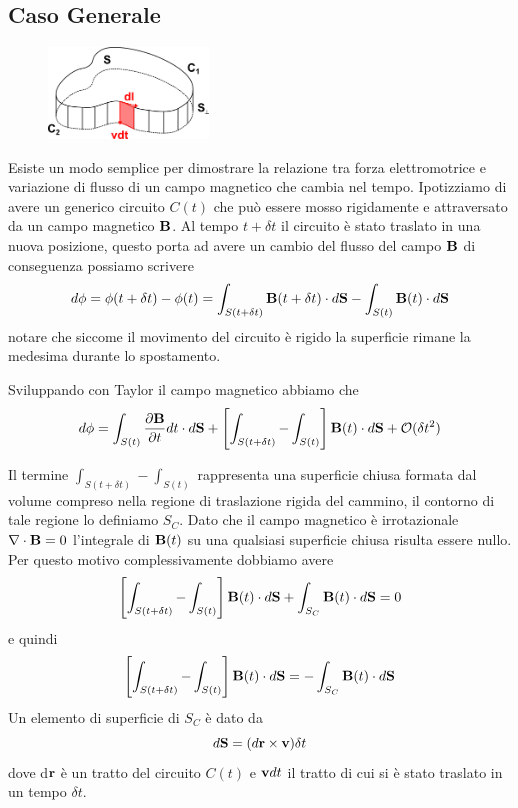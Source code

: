 \subsection{Caso Generale }
\begin{figure} %
    \centering
    \includegraphics[width=0.38\textwidth]{images/flux_theorem.png} %
\end{figure}

Esiste un modo semplice per dimostrare la relazione tra forza elettromotrice e variazione di flusso di un campo magnetico che cambia nel tempo. Ipotizziamo di avere un generico circuito $C(t)$ che pu\`o essere mosso rigidamente e attraversato da un campo magnetico $\bold{B}$. Al tempo $t + \delta t$ il circuito \`e stato traslato in una nuova posizione, questo porta ad avere un cambio del flusso del campo $\bold{B}$ di conseguenza possiamo scrivere 
\begin{equation*}
	d \phi = \phi(t + \delta t) - \phi(t) = \int_{S(t+ \delta t)} \bold{B}(t+\delta t) \cdot d\bold{S} - \int_{S(t)} \bold{B}(t) \cdot d\bold{S}
\end{equation*}
notare che siccome il movimento del circuito \`e rigido la superficie rimane la medesima durante lo spostamento.

Sviluppando con Taylor il campo magnetico abbiamo che 
\begin{equation}
	d \phi = \int_{S(t)} \frac{\partial \bold{B}}{\partial t}dt \cdot d \bold{S} + \left[\int_{S(t+\delta t)} - \int _{S(t)}\right]\bold{B}(t) \cdot d\bold{S} + \mathcal{O}(\delta t^2)
\end{equation}

Il termine $\int_{S(t+ \delta t)} - \int_{S(t)}$ rappresenta una superficie chiusa  formata dal volume compreso nella regione di traslazione rigida del cammino, il contorno di tale regione lo definiamo $S_C$. Dato che il campo magnetico \`e  irrotazionale $\nabla \cdot \bold{B} = 0$ l'integrale di $\bold{B}(t)$ su una qualsiasi superficie chiusa risulta essere nullo. Per questo motivo complessivamente dobbiamo avere 
\begin{equation*}
	\left[\int_{S(t + \delta t)} - \int_{S(t)}\right] \bold{B}(t) \cdot d\bold{S} + \int_{S_C} \bold{B}(t) \cdot d \bold{S} = 0  
\end{equation*}
e quindi 
\begin{equation*}
\left[\int_{S(t + \delta t)} - \int_{S(t)}\right] \bold{B}(t) \cdot d\bold{S} = -\int_{S_C} \bold{B}(t) \cdot d \bold{S}  
\end{equation*}
Un elemento di superficie di $S_C$ \`e dato da 
\begin{equation*}
	d\bold{S} = (d\bold{r} \times \bold{v}) \delta t
\end{equation*} 
dove d$\bold{r}$ \`e un tratto del circuito $C(t)$ e $\bold{v}dt$ il tratto di cui si \`e stato traslato in un tempo $\delta t$.

